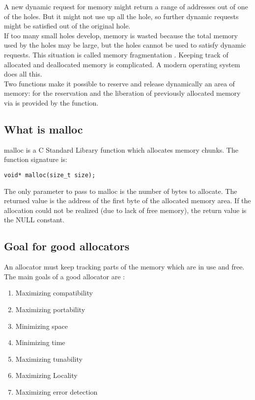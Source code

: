 A new dynamic request for memory might return a range of addresses out of one of the holes. But it might not use up all the hole, so further dynamic requests might be satisfied out of the original hole.\\

If too many small holes develop, memory is wasted because the total memory used by the holes may be large, but the holes cannot be used to satisfy dynamic requests. This situation is called memory fragmentation \cite{Knuth73a}. Keeping track of allocated and deallocated memory is complicated. A modern operating system does all this.\\

Two functions make it possible to reserve and release dynamically an area of memory:  for the reservation and the liberation of previously allocated memory via  is provided by the  function.

\subsection{What is malloc}
malloc is a C Standard Library function which allocates memory chunks.
The function signature is:
\begin{lstlisting}
void* malloc(size_t size);
\end{lstlisting}

The only parameter to pass to malloc is the number of bytes to allocate. The returned value is the address of the first byte of the allocated memory area. If the allocation could not be realized (due to lack of free memory), the return value is the NULL constant.




\subsection{Goal for good allocators}
An allocator must keep tracking parts of the memory which are in use and free.
The main goals of a good allocator are \cite{Lea12}:
\begin{enumerate}
\item Maximizing compatibility\\

\item Maximizing portability

\item Minimizing space

\item Minimizing time
\item Maximizing tunability
\item Maximizing Locality
\item Maximizing error detection
\end{enumerate}

